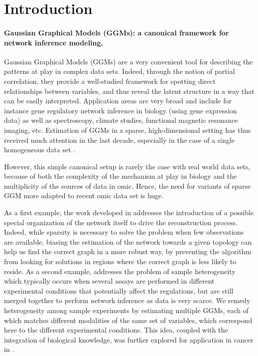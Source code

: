\section{Introduction}

\paragraph*{Gaussian Graphical Models (GGMs): a canonical framework
  for network inference modeling.} Gaussian Graphical Models (GGMs)
\citep{1996_Book_Lauritzen,whittaker1990graphical} are a very
convenient tool for describing the patterns at play in complex data
sets.  Indeed, through the notion of partial correlation, they provide
a well-studied framework for spotting direct relationships between
variables, and thus reveal the latent structure in a way that can be
easily interpreted. Application areas are very broad and include for
instance gene regulatory network inference in biology (using gene
expression data) as well as spectroscopy, climate studies, functional
magnetic resonance imaging, etc.  Estimation of GGMs in a sparse,
high-dimensional setting has thus received much attention in the last
decade, especially in the case of a single homogeneous data set
\citep{2006_AS_Meinshausen,2007_BS_Friedman,2008_JMLR_Banerjee,2010_JMLR_Yuan,2011_AS_Cai}.

However, this simple canonical setup is rarely the case with real
world data sets, because of both the complexity of the mechanism at
play in biology and the multiplicity of the sources of data in
omic. Hence, the need for variants of sparse GGM more adapted to
recent omic data set is huge.

As a first example, the work developed in \cite{2009_EJS_Chiquet,
  2009_BI_Chiquet} addresses the introduction of a possible special
organization of the network itself to drive the reconstruction
process.  Indeed, while sparsity is necessary to solve the problem
when few observations are available, biasing the estimation of the
network towards a given topology can help us find the correct graph in
a more robust way, by preventing the algorithm from looking for
solutions in regions where the correct graph is less likely to
reside. As a second example, \cite{2011_SC_Chiquet} addresses the
problem of sample heterogeneity which typically occurs when several
assays are performed in different experimental conditions that
potentially affect the regulations, but are still merged together to
perform network inference as data is very scarce.  We remedy
heterogeneity among sample experiments by estimating multiple GGMs,
each of which matches different modalities of the same set of
variables, which correspond here to the different experimental
conditions. This idea, coupled with the integration of biological
knowledge, was further explored for application in cancer in
\cite{2014_inbook_jeanmougin}.

